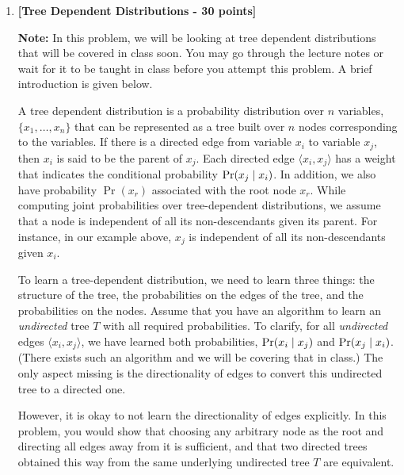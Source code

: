 \begin{enumerate}
    \item {\bf [Tree Dependent Distributions - 30 points]}


      {\bf Note:} In this problem, we will be looking at tree dependent
      distributions that will be covered in class soon. You may go through the
      lecture notes or wait for it to be taught in class before you attempt this
      problem. A brief introduction is given below.

      A tree dependent distribution is a probability distribution over $n$
      variables, $\{x_1,\ldots,x_n\}$ that can be represented as a tree built
      over $n$ nodes corresponding to the variables. If there is a directed edge
      from variable $x_i$ to variable $x_j$, then $x_i$ is said to be the parent
      of $x_j$. Each directed edge $\langle x_i, x_j\rangle$ has a weight that
      indicates the conditional probability $\Pr(x_j \;|\; x_i)$. In addition,
      we also have probability $\Pr(x_r)$ associated with the root node $x_r$.
      While computing joint probabilities over tree-dependent distributions, we
      assume that a node is independent of all its non-descendants given its
      parent. For instance, in our example above, $x_j$ is independent of all its
      non-descendants given $x_i$.

      To learn a tree-dependent distribution, we need to learn three things: the
      structure of the tree, the probabilities on the edges of the tree, and the
      probabilities on the nodes.  Assume that you have an algorithm to learn an
      {\em undirected} tree $T$ with all required probabilities. To clarify, for
      all {\em undirected} edges $\langle x_i, x_j\rangle$, we have learned both
      probabilities, $\Pr(x_i \;|\; x_j)$ and $\Pr(x_j \;|\; x_i)$.
      (There exists such an algorithm and we will be covering that in class.) The
      only aspect missing is the directionality of edges to convert this
      undirected tree to a directed one.

      However, it is okay to not learn the directionality of edges explicitly. In
      this problem, you would show that choosing any arbitrary node as the root
      and directing all edges away from it is sufficient, and that two directed
      trees obtained this way from the same underlying undirected tree $T$ are
      equivalent.


\end{enumerate}
